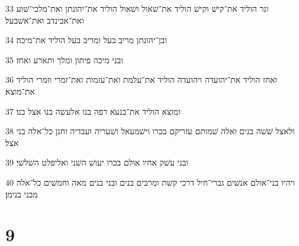 \par 33 ונר הוליד את־קישׁ וקישׁ הוליד את־שׁאול ושׁאול הוליד את־יהונתן ואת־מלכי־שׁוע ואת־אבינדב ואת־אשׁבעל׃
\par 34 ובן־יהונתן מריב בעל ומריב בעל הוליד את־מיכה׃
\par 35 ובני מיכה פיתון ומלך ותארע ואחז׃
\par 36 ואחז הוליד את־יהועדה ויהועדה הוליד את־עלמת ואת־עזמות ואת־זמרי וזמרי הוליד את־מוצא׃
\par 37 ומוצא הוליד את־בנעא רפה בנו אלעשׂה בנו אצל בנו׃
\par 38 ולאצל שׁשׁה בנים ואלה שׁמותם עזריקם בכרו וישׁמעאל ושׁעריה ועבדיה וחנן כל־אלה בני אצל׃
\par 39 ובני עשׁק אחיו אולם בכרו יעושׁ השׁני ואליפלט השׁלשׁי׃
\par 40 ויהיו בני־אולם אנשׁים גברי־חיל דרכי קשׁת ומרבים בנים ובני בנים מאה וחמשׁים כל־אלה מבני בנימן׃

\chapter{9}

